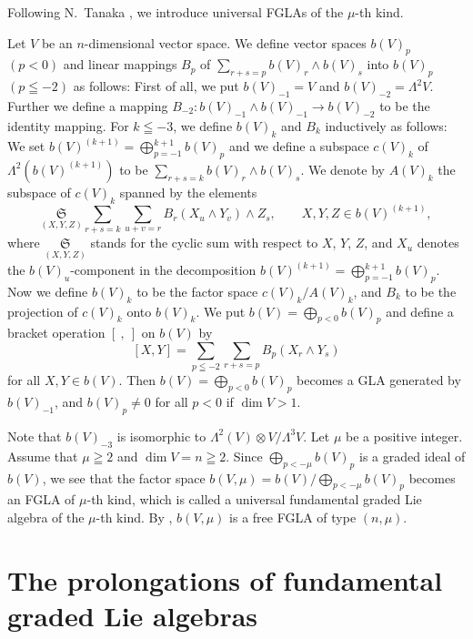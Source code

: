 \documentclass[11pt]{article}
\numberwithin{equation}{section}
\numberwithin{theorem}{section}
\numberwithin{proposition}{section}
\numberwithin{lemma}{section}
\numberwithin{corollary}{section}
\numberwithin{definition}{section}
\numberwithin{example}{section}
\numberwithin{remark}{section}
\numberwithin{note}{section}
\begin{document}
Following N.~Tanaka \cite{tan70:1}, we introduce universal FGLAs of the
$\mu$-th kind.

Let $V$ be an $n$-dimensional vector space.
We def\/ine vector spaces $b(V)_p$ $(p<0)$ and li\-near mappings $B_p$ of
$\sum\limits_{r+s=p}b(V)_r\wedge b(V)_s$ into $b(V)_p$ $(p\leqq -2)$
as follows:
First of all, we put \mbox{$b(V)_{-1}=V$} and $b(V)_{-2}=\Lambda^2V$. Further
we def\/ine a mapping $B_{-2}:b(V)_{-1}\wedge b(V)_{-1}\to b(V)_{-2}$
to be the identity mapping. For $k\leqq-3$, we def\/ine $b(V)_k$ and
$B_k$ inductively as follows:
We set $b(V)^{(k+1)}=\bigoplus\limits_{p=-1}^{k+1}b(V)_p$ and
we def\/ine a subspace $c(V)_k$ of $\Lambda^2(b(V)^{(k+1)})$ to be
$\sum\limits_{r+s=k}b(V)_r\wedge b(V)_s$.
We denote by $A(V)_k$ the subspace of $c(V)_k$ spanned by the elements
\[
\underset{(X,Y,Z)}{\mathfrak S}\sum_{r+s=k}\sum_{u+v=r}B_r(X_u\wedge Y_v)\wedge Z_s,
\qquad  X,Y,Z\in b(V)^{(k+1)} ,
\]
where $\underset{(X,Y,Z)}{\mathfrak S}$ stands for the cyclic sum with respect to $X$, $Y$, $Z$, and $X_u$ denotes the $b(V)_u$-component in the decomposition
$b(V)^{(k+1)}=\bigoplus\limits_{p=-1}^{k+1}b(V)_p$.
Now we def\/ine $b(V)_k$ to be the factor space $c(V)_k/A(V)_k$, and
$B_k$ to be the projection of $c(V)_k$ onto $b(V)_k$.
We put $b(V)=\bigoplus\limits_{p<0}b(V)_p$ and def\/ine a bracket operation
$[\ , \ ]$ on $b(V)$ by
\[
[X,Y]=\sum_{p\leqq-2}\sum_{r+s=p}B_p(X_r\wedge Y_s)
\]
for all $X,Y\in b(V)$. Then $b(V)=\bigoplus\limits_{p<0}b(V)_p$ becomes a GLA generated by $b(V)_{-1}$, and $b(V)_p\ne0$ for all $p<0$ if $\dim V>1$.

Note that $b(V)_{-3}$ is isomorphic to $\Lambda^2(V)\otimes V/\Lambda^3V$.
Let $\mu$ be a positive integer. Assume that $\mu\geqq 2$ and $\dim V=n\geqq 2$.
Since $\bigoplus\limits_{p<-\mu}b(V)_p$ is a graded ideal of $b(V)$,
we see that the factor space $b(V,\mu)=b(V)/\bigoplus\limits_{p<-\mu}b(V)_p$
becomes an FGLA of $\mu$-th kind,
which is called a universal fundamental graded Lie algebra of the
$\mu$-th kind.
By \cite[Proposition~3.2]{tan70:1},
$b(V,\mu)$ is a free FGLA of type $(n,\mu)$.

\section{The prolongations of fundamental graded Lie algebras}\label{section4}
\end{document}
